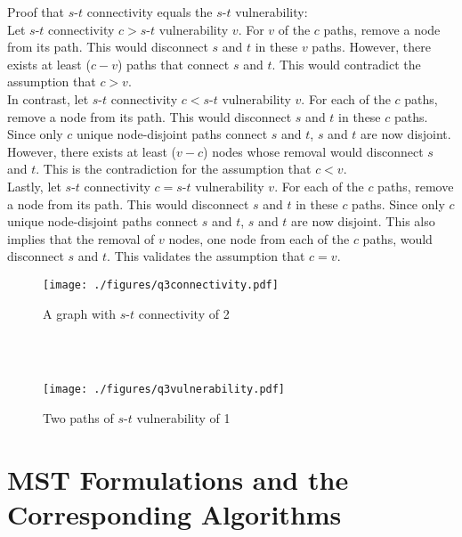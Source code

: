 \documentclass[letter,12pt]{article}
\begin{document}
Proof that $s$-$t$ connectivity equals the $s$-$t$ vulnerability: \\
Let $s$-$t$ connectivity $c > s$-$t$ vulnerability $v$. For $v$ of the $c$ paths, remove a node from its path. This would disconnect $s$ and $t$ in these $v$ paths. However, there exists at least ($c - v$) paths that connect $s$ and $t$. This would contradict the assumption that $c > v$. \\

In contrast, let $s$-$t$ connectivity $c < s$-$t$ vulnerability $v$. For each of the $c$ paths, remove a node from its path. This would disconnect $s$ and $t$ in these $c$ paths. Since only $c$ unique node-disjoint paths connect $s$ and $t$, $s$ and $t$ are now disjoint. However, there exists at least ($v - c$) nodes whose removal would disconnect $s$ and $t$. This is the contradiction for the assumption that $c < v$. \\

Lastly, let $s$-$t$ connectivity $c = s$-$t$ vulnerability $v$. For each of the $c$ paths, remove a node from its path. This would disconnect $s$ and $t$ in these $c$ paths. Since only $c$ unique node-disjoint paths connect $s$ and $t$, $s$ and $t$ are now disjoint. This also implies that the removal  of $v$ nodes, one node from each of the $c$ paths, would disconnect $s$ and $t$. This validates the assumption that $c = v$.

\newpage

\begin{figure}
\centering 
\texttt{[image: ./figures/q3connectivity.pdf]}
\caption{A graph with $s$-$t$ connectivity of 2}
\label{fig:stconnectivity}
\end{figure}
\ \\
\vspace{0.5in} \\

\begin{figure}
\centering 
\texttt{[image: ./figures/q3vulnerability.pdf]}
\caption{Two paths of $s$-$t$ vulnerability of 1}
\label{fig:stvulnerability}
\end{figure}






\newpage
\section{MST Formulations and the Corresponding Algorithms}
\label{sec:mst}
\end{document}

